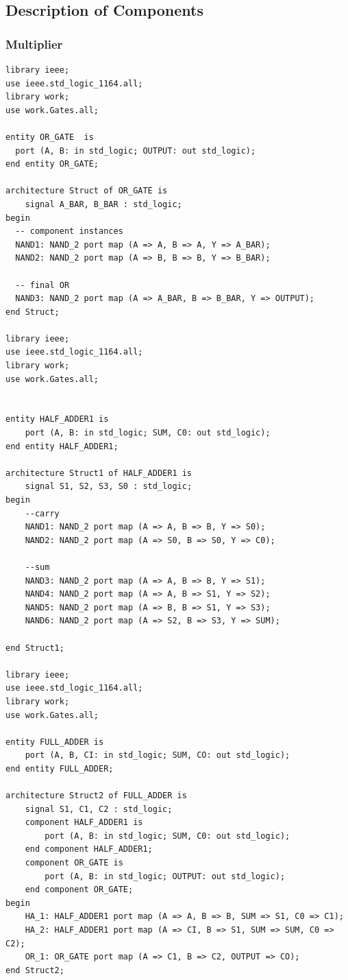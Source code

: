 \documentclass[12pt]{article}
\begin{document}
\subsection{Description of Components}
\subsubsection{Multiplier}
\begin{verbatim}
library ieee;
use ieee.std_logic_1164.all;
library work;
use work.Gates.all;

entity OR_GATE  is
  port (A, B: in std_logic; OUTPUT: out std_logic);
end entity OR_GATE;

architecture Struct of OR_GATE is
	signal A_BAR, B_BAR : std_logic;
begin
  -- component instances
  NAND1: NAND_2 port map (A => A, B => A, Y => A_BAR);
  NAND2: NAND_2 port map (A => B, B => B, Y => B_BAR);
  
  -- final OR
  NAND3: NAND_2 port map (A => A_BAR, B => B_BAR, Y => OUTPUT);
end Struct;

library ieee;
use ieee.std_logic_1164.all;
library work;
use work.Gates.all;


entity HALF_ADDER1 is
	port (A, B: in std_logic; SUM, C0: out std_logic);
end entity HALF_ADDER1;

architecture Struct1 of HALF_ADDER1 is
	signal S1, S2, S3, S0 : std_logic;
begin
	--carry
	NAND1: NAND_2 port map (A => A, B => B, Y => S0);
	NAND2: NAND_2 port map (A => S0, B => S0, Y => C0);
	
	--sum
	NAND3: NAND_2 port map (A => A, B => B, Y => S1);
	NAND4: NAND_2 port map (A => A, B => S1, Y => S2);
	NAND5: NAND_2 port map (A => B, B => S1, Y => S3);
	NAND6: NAND_2 port map (A => S2, B => S3, Y => SUM);

end Struct1;

library ieee;
use ieee.std_logic_1164.all;
library work;
use work.Gates.all;

entity FULL_ADDER is
	port (A, B, CI: in std_logic; SUM, CO: out std_logic);
end entity FULL_ADDER;

architecture Struct2 of FULL_ADDER is
	signal S1, C1, C2 : std_logic;
	component HALF_ADDER1 is
		port (A, B: in std_logic; SUM, C0: out std_logic);
	end component HALF_ADDER1;
	component OR_GATE is
		port (A, B: in std_logic; OUTPUT: out std_logic);
	end component OR_GATE;
begin
	HA_1: HALF_ADDER1 port map (A => A, B => B, SUM => S1, C0 => C1);
	HA_2: HALF_ADDER1 port map (A => CI, B => S1, SUM => SUM, C0 => C2);
	OR_1: OR_GATE port map (A => C1, B => C2, OUTPUT => CO);
end Struct2;


\end{verbatim}
\end{document}
